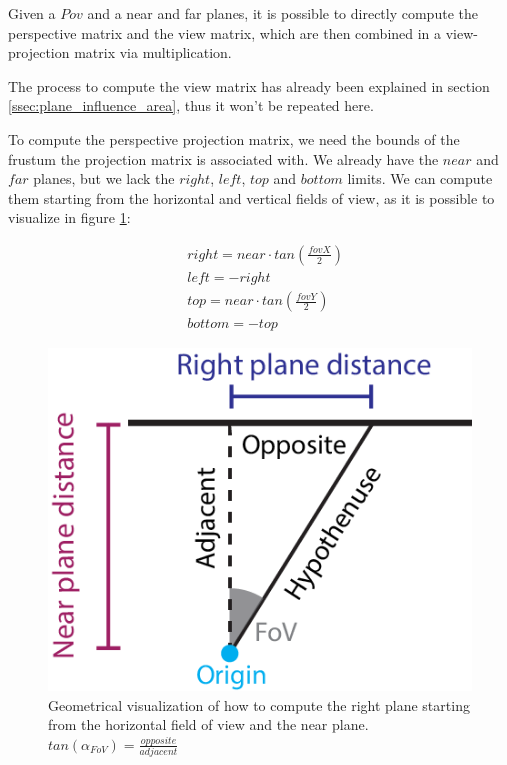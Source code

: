 \documentclass{PoliMi_MasterThesis}
\begin{document}
Given a $Pov$ and a near and far planes, it is possible to directly compute the perspective matrix and the view matrix, which are then combined in a view-projection matrix via multiplication.

The process to compute the view matrix has already been explained in section \ref{ssec:plane_influence_area}, thus it won't be repeated here.

To compute the perspective projection matrix, we need the bounds of the frustum the projection matrix is associated with. We already have the $near$ and $far$ planes, but we lack the $right$, $left$, $top$ and $bottom$ limits. We can compute them starting from the horizontal and vertical fields of view, as it is possible to visualize in figure \ref{fig:fov_to_right}:

\begin{align*}
	&right = near \cdot tan(\frac{fovX}{2}) \\
	&left = -right \\
	&top = near \cdot tan(\frac{fovY}{2}) \\
	&bottom = -top
\end{align*}

\begin{figure}[H]
	\centering
	\includegraphics[width=\textwidth*\real{0.3}]{Images/right_plane.png}
	\caption{Geometrical visualization of how to compute the right plane starting from the horizontal field of view and the near plane. $tan({\alpha_{FoV}}) = \frac{opposite}{adjacent}$}
	\label{fig:fov_to_right}
\end{figure}
\end{document}
